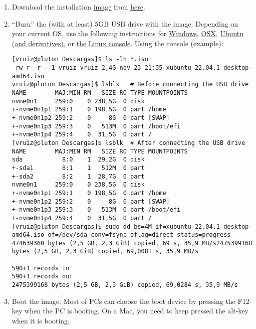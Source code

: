 \begin{enumerate}
  \item Download the
    installation \href{https://en.wikipedia.org/wiki/Disk_image}{image}
    from \href{https://xubuntu.org/download/}{here}.
    
  \item ``Burn'' the (with at least) 5GB USB drive with the
    image. Depending on your current OS, use the following
    instructions
    for \href{https://ubuntu.com/tutorials/create-a-usb-stick-on-windows#1-overview}{Windows}, \href{https://ubuntu.com/tutorials/create-a-usb-stick-on-macos#1-overview}{OSX}, \href{https://ubuntu.com/tutorials/create-a-usb-stick-on-ubuntu#1-overview}{Ubuntu
    (and derivatives)},
    or \href{https://askubuntu.com/questions/372607/how-to-create-a-bootable-ubuntu-usb-flash-drive-from-terminal}{the
    Linux console}. Using the console (example):

\begin{verbatim}
[vruiz@pluton Descargas]$ ls -lh *.iso
-rw-r--r-- 1 vruiz vruiz 2,4G nov 23 21:35 xubuntu-22.04.1-desktop-amd64.iso
vruiz@pluton Descargas]$ lsblk   # Before connecting the USB drive
NAME        MAJ:MIN RM   SIZE RO TYPE MOUNTPOINTS
nvme0n1     259:0    0 238,5G  0 disk 
+-nvme0n1p1 259:1    0 198,5G  0 part /home
+-nvme0n1p2 259:2    0     8G  0 part [SWAP]
+-nvme0n1p3 259:3    0   513M  0 part /boot/efi
+-nvme0n1p4 259:4    0  31,5G  0 part /
[vruiz@pluton Descargas]$ lsblk  # After connecting the USB drive 
NAME        MAJ:MIN RM   SIZE RO TYPE MOUNTPOINTS
sda           8:0    1  29,2G  0 disk 
+-sda1        8:1    1   512M  0 part 
+-sda2        8:2    1  28,7G  0 part 
nvme0n1     259:0    0 238,5G  0 disk 
+-nvme0n1p1 259:1    0 198,5G  0 part /home
+-nvme0n1p2 259:2    0     8G  0 part [SWAP]
+-nvme0n1p3 259:3    0   513M  0 part /boot/efi
+-nvme0n1p4 259:4    0  31,5G  0 part /
[vruiz@pluton Descargas]$ sudo dd bs=4M if=xubuntu-22.04.1-desktop-amd64.iso of=/dev/sda conv=fsync oflag=direct status=progress
474639360 bytes (2,5 GB, 2,3 GiB) copied, 69 s, 35,9 MB/s2475399168 bytes (2,5 GB, 2,3 GiB) copied, 69,0081 s, 35,9 MB/s

590+1 records in
590+1 records out
2475399168 bytes (2,5 GB, 2,3 GiB) copied, 69,0284 s, 35,9 MB/s
\end{verbatim}

\item Boot the image. Most of PCs can choose the boot device by pressing the
  F12-key when the PC is booting. On a Mac, you need to keep pressed
  the alt-key when it is booting.
  

\end{enumerate}
